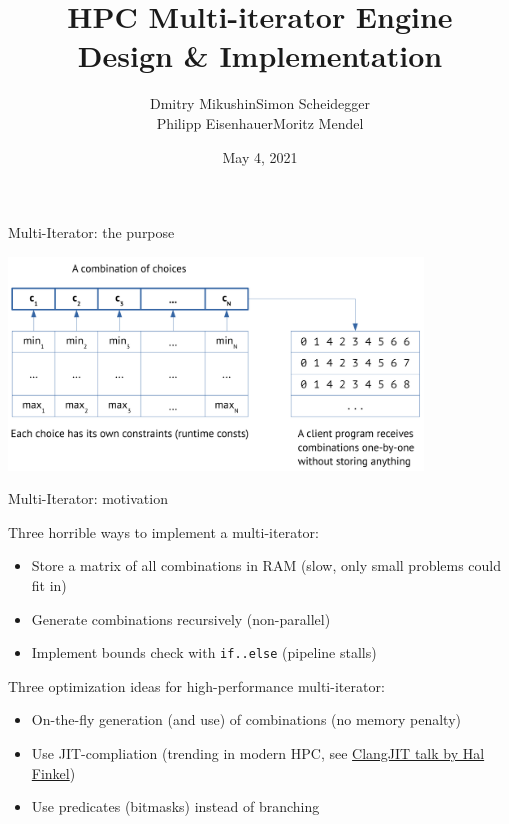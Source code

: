 \documentclass[aspectratio=169,twoside]{beamer}
\title[HPC Multi-iterator Engine]{HPC Multi-iterator Engine\\ Design \& Implementation}
\author[Dmitry Mikushin et al.]{Dmitry Mikushin\quad Simon Scheidegger\\ Philipp Eisenhauer\quad Moritz Mendel}
\institute[UNIL]{}
\date{May 4, 2021}
\begin{document}
{
\begin{frame}
  \titlepage
\end{frame}
}
\addtocounter{framenumber}{-1}






\begin{frame}[fragile]{Multi-Iterator: the purpose}

\begin{center}
\includegraphics[width=11cm]{figures/combinations}
\end{center}

\end{frame}



\begin{frame}[fragile]{Multi-Iterator: motivation}

Three horrible ways to implement a multi-iterator:

\begin{itemize}
\item Store a matrix of all combinations in RAM (slow, only small problems could fit in)
\item Generate combinations recursively (non-parallel)
\item Implement bounds check with \texttt{if..else} (pipeline stalls)
\end{itemize}

\vskip10pt

Three optimization ideas for high-performance multi-iterator:

\begin{itemize}
\item On-the-fly generation (and use) of combinations (no memory penalty)
\item Use JIT-compliation (trending in modern HPC, see \href{https://www.youtube.com/watch?v=6dv9vdGIaWs&ab_channel=CppCon}{ClangJIT talk by Hal Finkel})
\item Use predicates (bitmasks) instead of branching
\end{itemize}

\end{frame}
\end{document}
